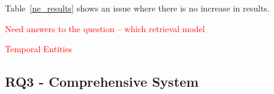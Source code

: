 \documentclass{mpaper}
\newcommand{\remove}[1]{\textcolor{red}{#1}}
\begin{document}
Table~\ref{ne_results} shows an issue where there is no increase in results.

\remove{Need answers to the question -- which retrieval model}

\remove{Temporal Entities}
\begin{center}
\begin{table}[h]
\centering
{}
\caption{Named Entity Features During Learning To Rank}
\label{ne_results}
\end{table}
\end{center}

\begin{center}
\begin{table}[h]
\centering
{}
\caption{focus time calculations}
\label{focus_time_calculations}
\end{table}
\end{center}

\subsection{RQ3 - Comprehensive System}
\end{document}
